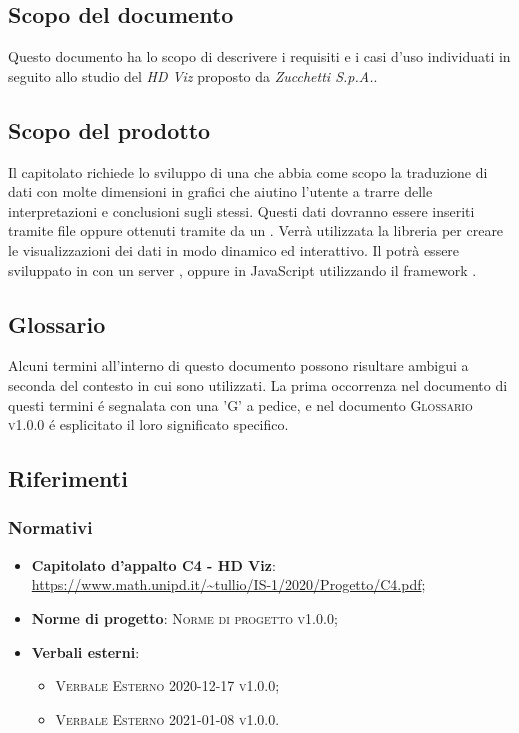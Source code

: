 \documentclass[../analisi-dei-requisiti.tex]{subfiles}
\begin{document}
\subsection{Scopo del documento}%
\label{sub:scopo_del_documento}
Questo documento ha lo scopo di descrivere i requisiti e i casi d'uso individuati in seguito allo studio del  \emph{HD Viz} proposto da \emph{Zucchetti S.p.A.}. 

\subsection{Scopo del prodotto}%
\label{sub:scopo_del_prodotto}
Il capitolato richiede lo sviluppo di una  che abbia come scopo la 
traduzione di dati con molte dimensioni in grafici che aiutino l’utente a trarre delle interpretazioni e conclusioni sugli stessi. 
Questi dati dovranno essere inseriti tramite file  oppure ottenuti tramite  da un .
Verrà utilizzata la libreria   per creare le visualizzazioni dei dati in modo dinamico ed interattivo.
Il  potrà essere sviluppato in  con un server ,  oppure 
in JavaScript utilizzando il framework . 


\subsection{Glossario}
\label{sub:glossario}
Alcuni termini all'interno di questo documento possono risultare ambigui a seconda del contesto in cui sono utilizzati.
La prima occorrenza nel documento di questi termini é segnalata con una 'G' a pedice, e nel documento 
\textsc{Glossario v1.0.0} é esplicitato il loro significato specifico.


\subsection{Riferimenti}
\label{sub:riferimenti}

\subsubsection{Normativi}%
\label{ssub:normativi}


\begin{itemize}
  \item \textbf{Capitolato d'appalto C4 - HD Viz}: \\
  \url{https://www.math.unipd.it/~tullio/IS-1/2020/Progetto/C4.pdf};
  \item \textbf{Norme di progetto}: \textsc{Norme di progetto v1.0.0};
  \item \textbf{Verbali esterni}:
  \begin{itemize}
    \item \textsc{Verbale Esterno 2020-12-17 v1.0.0};
    \item \textsc{Verbale Esterno 2021-01-08 v1.0.0}.
  \end{itemize}
\end{itemize}
\end{document}

